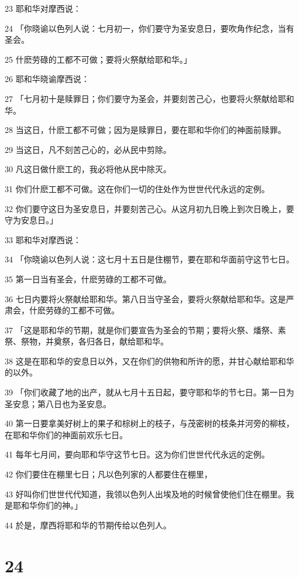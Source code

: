 \par 23 耶和华对摩西说：
\par 24 「你晓谕以色列人说：七月初一，你们要守为圣安息日，要吹角作纪念，当有圣会。
\par 25 什麽劳碌的工都不可做；要将火祭献给耶和华。」
\par 26 耶和华晓谕摩西说：
\par 27 「七月初十是赎罪日；你们要守为圣会，并要刻苦己心，也要将火祭献给耶和华。
\par 28 当这日，什麽工都不可做；因为是赎罪日，要在耶和华你们的神面前赎罪。
\par 29 当这日，凡不刻苦己心的，必从民中剪除。
\par 30 凡这日做什麽工的，我必将他从民中除灭。
\par 31 你们什麽工都不可做。这在你们一切的住处作为世世代代永远的定例。
\par 32 你们要守这日为圣安息日，并要刻苦己心。从这月初九日晚上到次日晚上，要守为安息日。」
\par 33 耶和华对摩西说：
\par 34 「你晓谕以色列人说：这七月十五日是住棚节，要在耶和华面前守这节七日。
\par 35 第一日当有圣会，什麽劳碌的工都不可做。
\par 36 七日内要将火祭献给耶和华。第八日当守圣会，要将火祭献给耶和华。这是严肃会，什麽劳碌的工都不可做。
\par 37 「这是耶和华的节期，就是你们要宣告为圣会的节期；要将火祭、燔祭、素祭、祭物，并奠祭，各归各日，献给耶和华。
\par 38 这是在耶和华的安息日以外，又在你们的供物和所许的愿，并甘心献给耶和华的以外。
\par 39 「你们收藏了地的出产，就从七月十五日起，要守耶和华的节七日。第一日为圣安息；第八日也为圣安息。
\par 40 第一日要拿美好树上的果子和棕树上的枝子，与茂密树的枝条并河旁的柳枝，在耶和华你们的神面前欢乐七日。
\par 41 每年七月间，要向耶和华守这节七日。这为你们世世代代永远的定例。
\par 42 你们要住在棚里七日；凡以色列家的人都要住在棚里，
\par 43 好叫你们世世代代知道，我领以色列人出埃及地的时候曾使他们住在棚里。我是耶和华你们的神。」
\par 44 於是，摩西将耶和华的节期传给以色列人。

\chapter{24}

